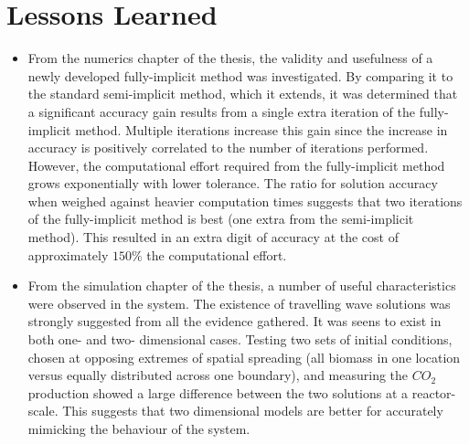 \section{Lessons Learned}

\begin{itemize}
  \item From the numerics chapter of the thesis, the validity and usefulness of a newly developed fully-implicit method was investigated.
    By comparing it to the standard semi-implicit method, which it extends, it was determined that a significant accuracy gain results from a single extra iteration of the fully-implicit method.
    Multiple iterations increase this gain since the increase in accuracy is positively correlated to the number of iterations performed.
    However, the computational effort required from the fully-implicit method grows exponentially with lower tolerance.
    The ratio for solution accuracy when weighed against heavier computation times suggests that two iterations of the fully-implicit method is best (one extra from the semi-implicit method).
    This resulted in an extra digit of accuracy at the cost of approximately $150\%$ the computational effort.
  \item From the simulation chapter of the thesis, a number of useful characteristics were observed in the system.
    The existence of travelling wave solutions was strongly suggested from all the evidence gathered.
    It was seens to exist in both one- and two- dimensional cases. 
    Testing two sets of initial conditions, chosen at opposing extremes of spatial spreading (all biomass in one location versus equally distributed across one boundary), and measuring the $CO_2$ production showed a large difference between the two solutions at a reactor-scale.
    This suggests that two dimensional models are better for accurately mimicking the behaviour of the system.
\end{itemize}
